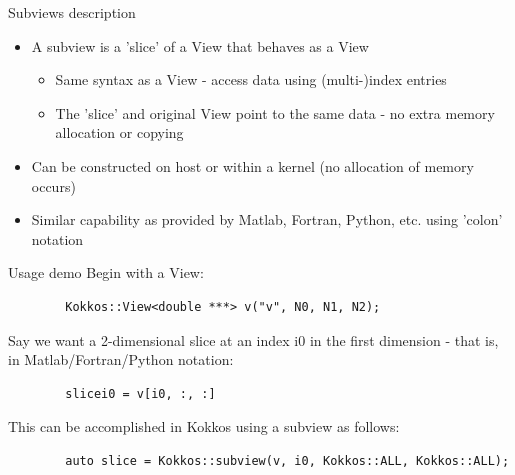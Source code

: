 \documentclass[
    aspectratio=169,
    \createHandout
]{beamer}
\begin{document}
\begin{frame}{Subviews description}
    \begin{itemize}
        \item A subview is a ’slice’ of a View that behaves as a View
        \pause
        \begin{itemize}
            \item Same syntax as a View - access data using (multi-)index entries
            \pause
            \item The ’slice’ and original View point to the same data - no extra
            memory allocation or copying
        \end{itemize}
        \pause
        \item Can be constructed on host or within a kernel (no allocation
        of memory occurs)
        \pause
        \item Similar capability as provided by Matlab, Fortran, Python, etc.
        using ’colon’ notation
    \end{itemize}
\end{frame}


\begin{frame}[fragile]{Usage demo}
    Begin with a View:
    \begin{verbatim}
        Kokkos::View<double ***> v("v", N0, N1, N2);
    \end{verbatim}
    \pause
    Say we want a 2-dimensional slice at an index i0 in the first
    dimension - that is, in Matlab/Fortran/Python notation:
    \begin{verbatim}
        slicei0 = v[i0, :, :]
    \end{verbatim}
    \pause
    This can be accomplished in Kokkos using a subview as follows:
    \begin{verbatim}
        auto slice = Kokkos::subview(v, i0, Kokkos::ALL, Kokkos::ALL);
    \end{verbatim}
\end{frame}

\end{document}
